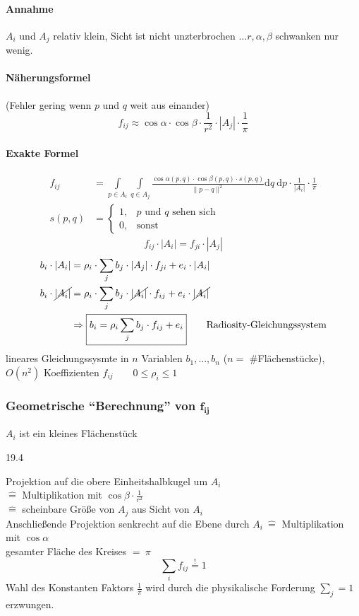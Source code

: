 \paragraph*{Annahme} $A_i$ und $A_j$ relativ klein, Sicht ist nicht unzterbrochen $... r, \alpha, \beta$ schwanken nur wenig.
\paragraph*{Näherungsformel} (Fehler gering wenn $p$ und $q$ weit aus einander)
\[f_{ij} \approx \cos \alpha \cdot \cos \beta \cdot \frac{1}{r^2} \cdot |A_j| \cdot \frac{1}{\pi} \]
\paragraph*{Exakte Formel}
\begin{align*}
f_{ij} &= \int\limits_{p \in A_i} \int\limits_{q \in A_j} \frac{\cos \alpha (p,q) \cdot \cos \beta (p,q) \cdot s(p,q)}{\|p - q\|^2} \mathrm{d}q\ \mathrm{d}p
	\cdot \frac{1}{|A_i|} \cdot \frac{1}{\pi}\\
s(p,q) &= \begin{cases}
		1, & \text{$p$ und $q$ sehen sich}\\
		0, &  \text{sonst}
          \end{cases}
\end{align*}
\[\boxed{f_{ij} \cdot |A_i| = f_{ji} \cdot |A_j|}\]
\begin{align*}
b_i \cdot |A_i| &= \rho_i \cdot \sum\limits_j b_j \cdot |A_j| \cdot f_{ji} + e_i \cdot |A_i|\\
b_i \cdot \cancel{|A_i|} &= \rho_i \cdot \sum\limits_j b_j \cdot \cancel{|A_i|} \cdot f_{ij} + e_i \cdot \cancel{|A_i|}\\
	&\Rightarrow \boxed{b_i = \rho_i \sum\limits_j b_j \cdot f_{ij} + e_i} \qquad \text{Radiosity-Gleichungssystem}
\end{align*}
lineares Gleichungssysmte in $n$ Variablen $b_1, ..., b_n$ ($n =$ \#Flächenstücke), $O(n^2)$ Koeffizienten $f_{ij} \qquad 0 \le \rho_i \le 1$

\subsubsection{Geometrische "`Berechnung"' von $\boldsymbol{f_{ij}}$}
$A_i$ ist ein kleines Flächenstück
\begin{center}
 19.4
\end{center}
Projektion auf die obere Einheitshalbkugel um $A_i$\\
$\hat =$ Multiplikation mit $\cos \beta \cdot \frac{1}{r^2}$\\
$\hat =$ scheinbare Größe von $A_j$ aus Sicht von $A_i$\\
Anschließende Projektion senkrecht auf die Ebene durch $A_i\ \hat =$ Multiplikation mit $\cos \alpha$\\
gesamter Fläche des Kreises $=\ \pi$
\[\sum\limits_i f_{ij} \stackrel{\mathbf{!}}= 1\]
Wahl des Konstanten Faktors $\frac{1}{\pi}$ wird durch die physikalische Forderung $\sum\limits_{j} = 1$ erzwungen.

